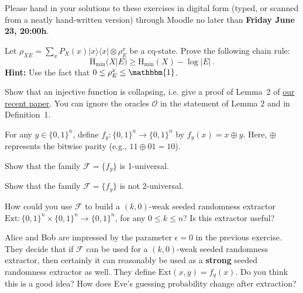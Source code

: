 \documentclass[a4paper,10pt,landscape,twocolumn]{scrartcl}
\newcommand{\ket}[1]{| #1 \rangle}
\newcommand{\bra}[1]{\langle #1 |}
\newcommand\deadline{Friday June 23, 20:00h}
\begin{document}
\newcommand{\Hmin}{\mathrm{H}_{\mathrm{min}}}

\homeworkproblems

{\sffamily\noindent
Please hand in your solutions to these exercises in digital form (typed, or scanned from a neatly hand-written version) through Moodle no later than \textbf{\deadline}.  %
}

\begin{exercise}
Let $\rho_{XE} = \sum_x P_X(x) \ket{x}\bra{x} \otimes \rho_E^x$ be a cq-state. Prove the following chain rule:
\[
\Hmin(X | E) \geq \Hmin(X) - \log |E| \, .
\]
\textbf{Hint: } Use the fact that $0 \leq \rho_E^x \leq \mathbbm{1}$.

\end{exercise}

\begin{exercise}
Show that an injective function is collapsing, i.e. give a proof of Lemma~2 of \href{http://homepages.cwi.nl/~schaffne/spool/sponges.pdf}{our recent paper}. You can ignore the oracles $\mathcal{O}$ in the statement of Lemma 2 and in Definition~1.
\end{exercise}

\begin{exercise}
	For any $y \in \{0,1\}^n$, define $f_y : \{0,1\}^n \to \{0,1\}^n$ by $f_y(x) = x \oplus y$. Here, $\oplus$ represents the bitwise parity (e.g., $11 \oplus 01 = 10$).
	\begin{subex}
		Show that the family $\mathscr{F} = \{f_y\}$ is 1-universal.
	\end{subex}
    \begin{subex}
        Show that the family $\mathscr{F} = \{f_y\}$ is not 2-universal.
    \end{subex}
    \begin{subex}
    	How could you use $\mathscr{F}$ to build a $(k,0)$-weak seeded randomness extractor $\text{Ext} : \{0,1\}^n \times \{0,1\}^n \to \{0,1\}^n$, for any $0 \leq k \leq n$? Is this extractor useful?
    \end{subex}
    \begin{subex}
    	Alice and Bob are impressed by the parameter $\epsilon = 0$ in the previous exercise. They decide that if $\mathscr{F}$ can be used for a $(k,0)$-weak seeded randomness extractor, then certainly it can reasonably be used as a \textbf{strong} seeded randomness extractor as well. They define $\text{Ext}(x,y) = f_y(x)$. Do you think this is a good idea? How does Eve's guessing probability change after extraction?
    \end{subex}
\end{exercise}
\end{document}
